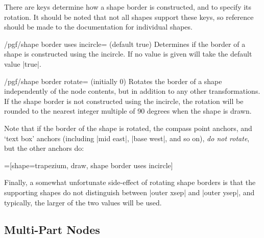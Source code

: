 There are \pgfname{} keys determine how a shape border is
constructed, and to specify its rotation.
It should be noted that not all shapes support these keys, so
reference should be made to the documentation for individual
shapes.
	
\begin{key}{/pgf/shape border uses incircle=
    (default true)}
  Determines if the border of a shape is constructed using the
  incircle. If no value is given  will take the default
  value |true|.
\end{key}


\begin{key}{/pgf/shape border rotate= (initially 0)}
  Rotates the border of a shape independently of the node contents,
  but in addition to any other transformations. If the shape
  border is not constructed using the incircle, the rotation will be
  rounded to the nearest integer multiple of 90 degrees when the
  shape is drawn.
\end{key}

Note that if the border of the shape is rotated,
the compass point anchors, and `text box' anchors (including
|mid east|, |base west|, and so on), \emph{do not rotate}, but the
other anchors do:
	
\begin{codeexample}[]
=[shape=trapezium, draw, shape border uses incircle]
\end{codeexample}

Finally, a somewhat unfortunate side-effect of rotating shape borders
is that the supporting shapes do not distinguish between
|outer xsep| and |outer ysep|, and typically, the larger of the
two values will be used.




\subsection{Multi-Part Nodes}

\label{section-nodes-multi}

